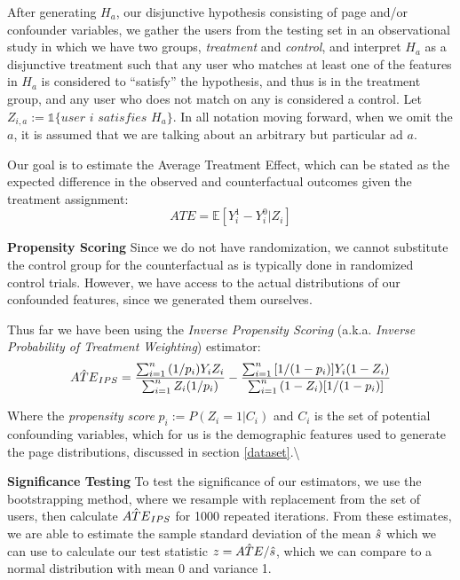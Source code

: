 \documentclass[]{article}
\begin{document}
After generating \(H_a\), our disjunctive hypothesis consisting of page
and/or confounder variables, we gather the users from the testing set in
an observational study in which we have two groups, \textit{treatment}
and \textit{control}, and interpret \(H_a\) as a disjunctive treatment
such that any user who matches at least one of the features in \(H_a\)
is considered to ``satisfy'' the hypothesis, and thus is in the
treatment group, and any user who does not match on any is considered a
control. Let \(Z_{i,a} := \mathbb{1}\{\textit{user i satisfies }H_a\}\).
In all notation moving forward, when we omit the \(a\), it is assumed
that we are talking about an arbitrary but particular ad \(a\).

Our goal is to estimate the Average Treatment Effect, which can be
stated as the expected difference in the observed and counterfactual
outcomes given the treatment assignment: \begin{equation}
ATE = \mathbb{E}[Y^1_{i} - Y^0_{i} | Z_{i}]
\end{equation}

\textbf{Propensity Scoring} Since we do not have randomization, we
cannot substitute the control group for the counterfactual as is
typically done in randomized control trials. However, we have access to
the actual distributions of our confounded features, since we generated
them ourselves.

Thus far we have been using the \textit{Inverse Propensity Scoring}
(a.k.a. \textit{Inverse Probability of Treatment Weighting}) estimator:
\begin{equation}
\Hat{ATE}_{IPS} = \frac{\sum_{i=1}^{n}{(1/p_{i})}Y_i Z_i}{\sum_{i=1}^{n}{Z_i (1/p_i})} - \frac{\sum_{i=1}^{n}{[1/(1 - p_i)] Y_i (1 - Z_i)}}{\sum_{i=1}^{n}{(1-Z_i) [1/(1-p_i)]}}
\end{equation}

Where the \textit{propensity score} \(p_i := P(Z_i = 1 | C_i)\) and
\(C_i\) is the set of potential confounding variables, which for us is
the demographic features used to generate the page distributions,
discussed in section \ref{dataset}.\textbackslash{}

\textbf{Significance Testing} To test the significance of our
estimators, we use the bootstrapping method, where we resample with
replacement from the set of users, then calculate \(\Hat{ATE}_{IPS}\)
for 1000 repeated iterations. From these estimates, we are able to
estimate the sample standard deviation of the mean \(\Hat{s}\) which we
can use to calculate our test statistic \(z = \Hat{ATE}/\Hat{s}\), which
we can compare to a normal distribution with mean 0 and variance 1.
\end{document}
